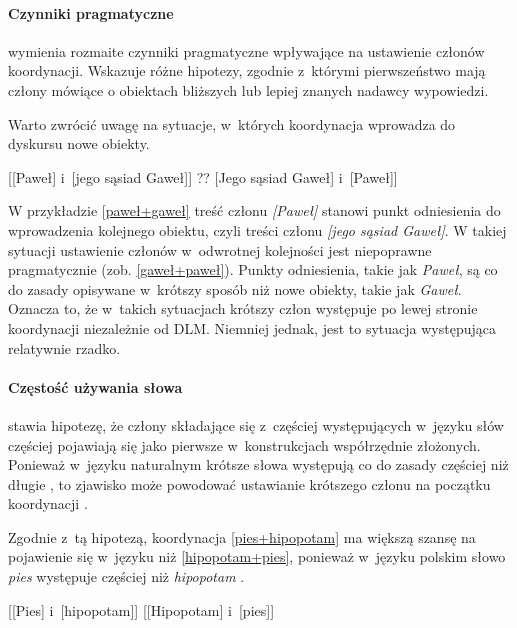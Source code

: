 \paragraph{Czynniki pragmatyczne} 

\cite{lohmann2014english} wymienia rozmaite czynniki pragmatyczne wpływające na ustawienie członów koordynacji. Wskazuje różne hipotezy, zgodnie z~którymi pierwszeństwo mają człony mówiące o obiektach bliższych lub lepiej znanych nadawcy wypowiedzi. 

Warto zwrócić uwagę na sytuacje, w~których koordynacja wprowadza do dyskursu nowe obiekty.

\begin{exe}
\ex \label{paweł+gaweł} {[[Paweł] i~[jego sąsiad Gaweł]]}
\ex \label{gaweł+paweł} {?? [Jego sąsiad Gaweł] i~[Paweł]]}
\end{exe}

W przykładzie \eqref{paweł+gaweł} treść członu \textit{[Paweł]} stanowi punkt odniesienia do wprowadzenia kolejnego obiektu, czyli treści członu \textit{[jego sąsiad Gaweł]}. W takiej sytuacji ustawienie członów w~odwrotnej kolejności jest niepoprawne pragmatycznie (zob. \eqref{gaweł+paweł}). Punkty odniesienia, takie jak \textit{Paweł}, są co do zasady opisywane w~krótszy sposób niż nowe obiekty, takie jak \textit{Gaweł}. Oznacza to, że w~takich sytuacjach krótszy człon występuje po lewej stronie koordynacji niezależnie od DLM. Niemniej jednak, jest to sytuacja występująca relatywnie rzadko.

\paragraph{Częstość używania słowa}
\cite{fenk1989word} stawia hipotezę, że człony składające się z~częściej występujących w~języku słów  częściej pojawiają się jako pierwsze w~konstrukcjach współrzędnie złożonych. Ponieważ w~języku naturalnym krótsze słowa występują co do zasady częściej niż długie \citep{zipf1946psychology}, to zjawisko może powodować ustawianie krótszego członu na początku koordynacji \citep[s. 54]{lohmann2014english}.

Zgodnie z~tą hipotezą, koordynacja \eqref{pies+hipopotam} ma większą szansę na pojawienie się w~języku niż \eqref{hipopotam+pies}, ponieważ w~języku polskim słowo \textit{pies} występuje częściej niż \textit{hipopotam} \citep{przepiorkowski2012narodowy}.

\begin{exe}
\ex \label{pies+hipopotam} {[[Pies] i~[hipopotam]]}
\ex \label{hipopotam+pies} {[[Hipopotam] i~[pies]]}
\end{exe}

